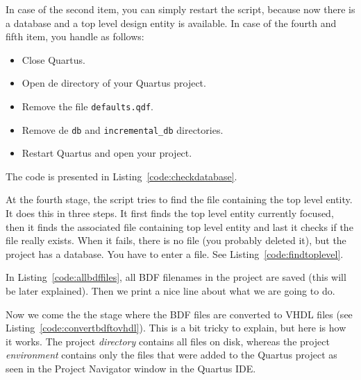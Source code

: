 \documentclass[11pt,a4paper,final,oneside,titlepage,fleqn]{article}
\begin{document}
\noindent
In case of the second item, you can simply restart the script, because now
there is a database and a top level design entity is available.
In case of the fourth and fifth item, you handle as follows:
\begin{itemize}
\item Close Quartus.
\item Open de directory of your Quartus project.
\item Remove the file \texttt{defaults.qdf}.
\item Remove de \texttt{db} and \texttt{incremental\_db} directories.
\item Restart Quartus and open your project.
\end{itemize}

\noindent
The code is presented in Listing~\ref{code:checkdatabase}.



At the fourth stage, the script tries to find the file containing the top level
entity. It does this in three steps. It first finds the top level entity
currently focused, then it finds the associated file containing top level
entity and last it checks if the file really exists. When it fails, there
is no file (you probably deleted it), but the project has a database. You
have to enter a file. See Listing~\ref{code:findtoplevel}.



In Listing~\ref{code:allbdffiles}, all BDF filenames in the project are saved
(this will be later explained). Then we print a nice line about what we are
going to do.



Now we come the the stage where the BDF files are converted to VHDL files
(see Listing~\ref{code:convertbdftovhdl}).
This is a bit tricky to explain, but here is how it works. The project \textit{directory}
contains all files on disk, whereas the project \textit{environment} contains only the
files that were added to the Quartus project as seen in the Project Navigator
window in the Quartus IDE.
\end{document}
